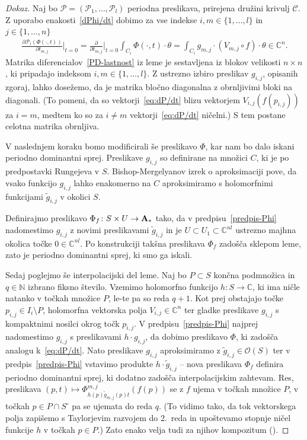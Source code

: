 \documentclass[12pt,a4paper,twoside]{article}
\theoremstyle{definition} %
\newenvironment{dokaz}[1][Dokaz]{\begin{proof}[#1]}{\end{proof}}
\theoremstyle{plain} %
\numberwithin{equation}{section}  %
\newcommand{\C}{\mathbb C}
\begin{document}
\begin{dokaz}
Naj bo $\mathcal{P} = (\mathcal{P}_{1}, \dots, \mathcal{P}_{l})$ periodna preslikava, prirejena družini krivulj $\mathcal{C}$. Z uporabo enakosti~\eqref{dPhi/dt} dobimo za vse indekse $i, m \in \{1, \dots, l \}$ in $j \in \{1, \dots, n \}$
\begin{gather} \label{eq:dP/dt}
\frac{\partial \mathcal{P}_{i}(\Phi(\cdot, t))}{\partial t_{m,j}} \Big|_{t=0} = \frac{\partial}{\partial t_{m,j}} \Big|_{t=0} \int_{C_{i}} \Phi(\cdot, t) \cdot \theta = \int_{C_{i}} g_{m,j} \cdot (V_{m,j} \circ f) \cdot \theta \in \C^{n}.
\end{gather}
Matrika diferencialov~\eqref{PD-lastnost} iz leme je sestavljena iz blokov velikosti $n \times n$, ki pripadajo indeksom $i, m \in \{1, \dots, l \}$. Z ustrezno izbiro preslikav $g_{i,j}$, opisanih zgoraj, lahko dosežemo, da je matrika bločno diagonalna z obrnljivimi bloki na diagonali. (To pomeni, da so vektorji~\eqref{eq:dP/dt} blizu vektorjem $V_{i,j}(f(p_{i,j}))$ za $i = m$, medtem ko so za $i \neq m$ vektorji~\eqref{eq:dP/dt} ničelni.) S tem postane celotna matrika obrnljiva.

V naslednjem koraku bomo modificirali še preslikavo $\Phi$, kar nam bo dalo iskani periodno dominantni sprej.
Preslikave $g_{i,j}$ so definirane na množici $C$, ki je po predpostavki Rungejeva v $S$. Bishop-Mergelyanov izrek o aproksimaciji pove, da vsako funkcijo $g_{i,j}$ lahko enakomerno na $C$ aproksimiramo s holomorfnimi funkcijami $\tilde{g}_{i,j}$ v okolici $S$.

Definirajmo preslikavo $\Phi_{f} \colon S \times U \to \textbf{\textup{A}}_{*}$ tako, da v predpisu~\eqref{predpis-Phi} nadomestimo $g_{i,j}$ z novimi preslikavami $\tilde{g}_{i,j}$ in je $U \subset U_{1} \subset \C^{nl}$ ustrezno majhna okolica točke $0 \in \mathbb{C}^{nl}$. Po konstrukciji takšna preslikava $\Phi_{f}$ zadošča sklepom leme, zato je periodno dominantni sprej, ki smo ga iskali.

Sedaj poglejmo še interpolacijski del leme. Naj bo $P \subset S$ končna podmnožica in $q \in \mathbb{N}$ izbrano fiksno število. Vzemimo holomorfno funkcijo $h \colon S \to \mathbb{C}$, ki ima ničle natanko v točkah množice $P$, le-te pa so reda $q+1$. Kot prej obstajajo točke $p_{i,j} \in I_{i} \setminus P$, holomorfna vektorska polja $V_{i,j} \in \mathbb{C}^{n}$ ter gladke preslikave $g_{i,j}$ s kompaktnimi nosilci okrog točk $p_{i,j}$. V predpisu~\eqref{predpis-Phi} najprej nadomestimo $g_{i,j}$ s preslikavami $h \cdot g_{i,j}$, da dobimo preslikavo $\Phi$, ki zadošča analogu k~\eqref{eq:dP/dt}. Nato preslikave $g_{i,j}$ aproksimiramo z $\tilde{g}_{i,j} \in \mathcal{O}(S)$ ter v predpis~\eqref{predpis-Phi} vstavimo produkte $h \cdot \tilde{g}_{i,j}$ -- nova preslikava $\Phi_{f}$ definira periodno dominantni sprej, ki dodatno zadošča interpolacijskim zahtevam.
Res, preslikava $(p,t) \mapsto \Phi_{h(p) \tilde{g}_{m,j}(p) t}^{m,j} (f(p))$ se z $f$ ujema v točkah množice $P$, v točkah $p \in P \cap S^{\circ}$ pa se ujemata do reda $q$. (To vidimo tako, da tok vektorskega polja zapišemo s Taylorjevim razvojem do 2.~reda in upoštevamo stopnje ničel funkcije $h$ v točkah $p \in P$.) Zato enako velja tudi za njihov kompozitum (\cite[Lemma~2.2]{alarcon2018interpolation}).


\end{dokaz}
\end{document}
